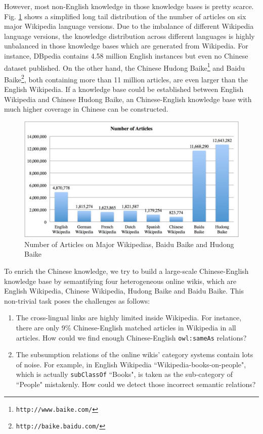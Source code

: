 \documentclass[runningheads,a4paper]{llncs}
\begin{document}
However, most non-English knowledge in those knowledge bases is pretty scarce. Fig. \ref{fig_stat} shows a simplified long tail distribution of the number of articles on six major Wikipedia language versions. Due to the imbalance of different Wikipedia language versions, the knowledge distribution across different languages is highly unbalanced in those knowledge bases which are generated from Wikipedia. For instance, DBpedia contains 4.58 million English instances but even no Chinese dataset published. On the other hand, the Chinese Hudong Baike\footnote{{\tt http://www.baike.com/}} and Baidu Baike\footnote{{\tt http://baike.baidu.com/}}, both containing more than 11 million articles, are even larger than the English Wikipedia. If a knowledge base could be established between English Wikipedia and Chinese Hudong Baike, an Chinese-English knowledge base with much higher coverage in Chinese can be constructed.

\begin{figure}[ht]
\centering
\includegraphics[width=0.75 \columnwidth]{fig/fig_stat.png}
\caption{Number of Articles on Major Wikipedias, Baidu Baike and Hudong Baike}
\label{fig_stat}
\end{figure}

To enrich the Chinese knowledge, we try to build a large-scale Chinese-English knowledge base by semantifying four heterogeneous online wikis, which are English Wikipedia, Chinese Wikipedia, Hudong Baike and Baidu Baike. This non-trivial task poses the challenges as follows:
\begin{enumerate}
  \item The cross-lingual links are highly limited inside Wikipedia. For instance, there are only 9\% Chinese-English matched articles in Wikipedia in all articles. How could we find enough Chinese-English \verb"owl:sameAs" relations?
  \item The subsumption relations of the online wikis' category systems contain lots of noise. For example, in English Wikipedia ``Wikipedia-books-on-people", which is actually \verb"subClassOf" ``Books", is taken as the sub-category of ``People" mistakenly. How could we detect those incorrect semantic relations?
\end{enumerate}
\end{document}
